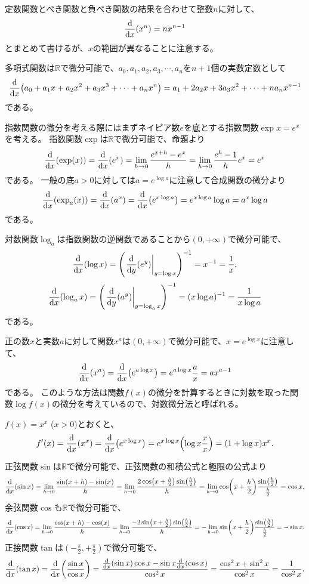 定数関数とべき関数と負べき関数の結果を合わせて整数$n$に対して、
$$
\dv{x}(x^n) = n x^{n-1}
$$
とまとめて書けるが、$x$の範囲が異なることに注意する。

多項式関数は$\mathbb{R}$で微分可能で、$a_0, a_1, a_2, a_3, \cdots, a_n$を$n+1$個の実数定数として
$$
\dv{x}(a_0+a_1 x+a_2 x^2+a_3 x^3+\cdots+a_n x^n) = a_1+2 a_2 x+3 a_3 x^2+\cdots+n a_n x^{n-1}
$$
である。

指数関数の微分を考える際にはまずネイピア数$e$を底とする指数関数$\exp x = e^x$を考える。
指数関数$\exp$は$\mathbb{R}$で微分可能で、命題より
$$
\dv{x}(\exp(x)) = \dv{x}(e^x) = \lim_{h \to 0}\frac{e^{x+h}-e^x}{h} = \lim_{h \to 0}\frac{e^h-1}{h}e^x = e^x
$$
である。
一般の底$a > 0$に対しては$a = e^{\log a}$に注意して合成関数の微分より
$$
\dv{x}(\exp_a(x)) = \dv{x}(a^x) = \dv{x}(e^{x\log a}) = e^{x\log a}\log a = a^x\log a
$$
である。

対数関数$\log_a$は指数関数の逆関数であることから$(0, +\infty)$で微分可能で、
$$
\dv{x}(\log x) = \qty(\eval{\dv{y}(e^y)}_{y = \log x})^{-1} = x^{-1} = \frac{1}{x},
$$
$$
\dv{x}(\log_a x) = \qty(\eval{\dv{y}(a^y)}_{y = \log_a x})^{-1} = (x\log a)^{-1} = \frac{1}{x\log a}
$$
である。

正の数$x$と実数$a$に対して関数$x^a$は$(0, +\infty)$で微分可能で、$x = e^{\log x}$に注意して、
$$
\dv{x}(x^a) = \dv{x}(e^{a\log x}) = e^{a\log x}\frac{a}{x} = a x^{a-1}
$$
である。
このような方法は関数$f(x)$の微分を計算するときに対数を取った関数$\log f(x)$の微分を考えているので、対数微分法と呼ばれる。

\begin{example}
$f(x) = x^x$ ($x > 0$)とおくと、
$$
f'(x) = \dv{x}(x^x) = \dv{x}(e^{x\log x}) = e^{x\log x}\qty(\log x\frac{x}{x}) = (1+\log x)x^x.
$$
\end{example}

正弦関数$\sin$は$\mathbb{R}$で微分可能で、正弦関数の和積公式と極限の公式より
$$
\dv{x}(\sin x)
= \lim_{h \to 0}\frac{\sin(x+h)-\sin(x)}{h}
= \lim_{h \to 0}\frac{2\cos(x+\frac{h}{2})\sin(\frac{h}{2})}{h}
= \lim_{h \to 0}\cos(x+\frac{h}{2})\frac{\sin(\frac{h}{2})}{\frac{h}{2}}
= \cos x.
$$
余弦関数$\cos$も$\mathbb{R}$で微分可能で、
$$
\dv{x}(\cos x)
= \lim_{h \to 0}\frac{\cos(x+h)-\cos(x)}{h}
= \lim_{h \to 0}\frac{-2\sin(x+\frac{h}{2})\sin(\frac{h}{2})}{h}
= -\lim_{h \to 0}\sin(x+\frac{h}{2})\frac{\sin(\frac{h}{2})}{\frac{h}{2}}
= -\sin x.
$$
正接関数$\tan$は$(-\frac{\pi}{2}, +\frac{\pi}{2})$で微分可能で、
$$
\dv{x}(\tan x)
= \dv{x}\qty(\frac{\sin x}{\cos x})
= \frac{\dv{x}(\sin x)\cos x-\sin x\dv{x}(\cos x)}{\cos^2 x}
= \frac{\cos^2 x+\sin^2 x}{\cos^2 x}
= \frac{1}{\cos^2 x}.
$$

